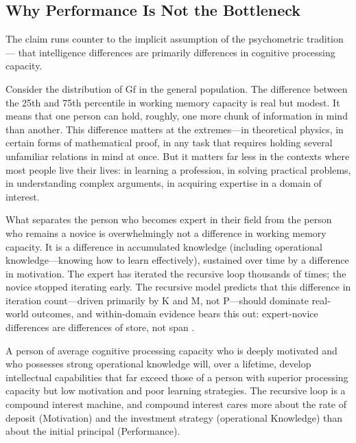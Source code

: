 \documentclass[12pt,a4paper]{article}
\begin{document}
\subsection{Why Performance Is Not the Bottleneck}

The claim runs counter to the implicit assumption of the psychometric tradition ---\hspace{0pt} that intelligence differences are primarily differences in cognitive processing capacity.

Consider the distribution of Gf in the general population. The difference between the 25th and 75th percentile in working memory capacity is real but modest. It means that one person can hold, roughly, one more chunk of information in mind than another. This difference matters at the extremes---\hspace{0pt}in theoretical physics, in certain forms of mathematical proof, in any task that requires holding several unfamiliar relations in mind at once. But it matters far less in the contexts where most people live their lives: in learning a profession, in solving practical problems, in understanding complex arguments, in acquiring expertise in a domain of interest.

What separates the person who becomes expert in their field from the person who remains a novice is overwhelmingly not a difference in working memory capacity. It is a difference in accumulated knowledge (including operational knowledge---\hspace{0pt}knowing how to learn effectively), sustained over time by a difference in motivation. The expert has iterated the recursive loop thousands of times; the novice stopped iterating early. The recursive model predicts that this difference in iteration count---\hspace{0pt}driven primarily by K and M, not P---\hspace{0pt}should dominate real-world outcomes, and within-domain evidence bears this out: expert-novice differences are differences of store, not span \citep{ChaseSimon1973}.

A person of average cognitive processing capacity who is deeply motivated and who possesses strong operational knowledge will, over a lifetime, develop intellectual capabilities that far exceed those of a person with superior processing capacity but low motivation and poor learning strategies. The recursive loop is a compound interest machine, and compound interest cares more about the rate of deposit (Motivation) and the investment strategy (operational Knowledge) than about the initial principal (Performance).
\end{document}
